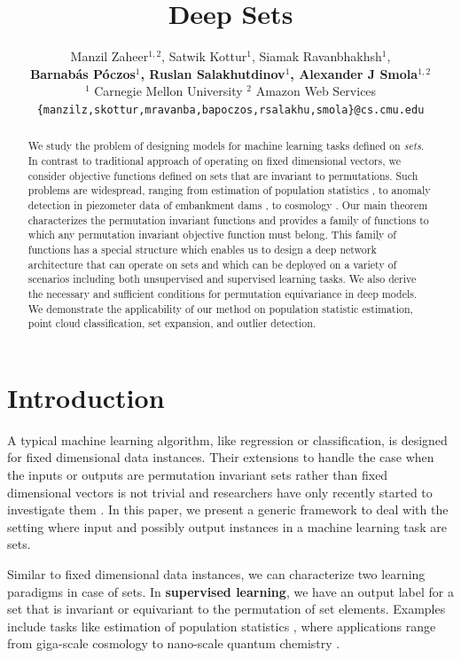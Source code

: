 \documentclass{article}
\title{Deep Sets}
\author{
Manzil Zaheer$^{1,2}$, 
Satwik Kottur$^1$, 
Siamak Ravanbhakhsh$^1$,\\
\textbf{Barnab\'as  P\'oczos$^1$,
Ruslan Salakhutdinov$^1$,
Alexander J Smola$^{1,2}$}\\
$^1$ Carnegie Mellon University \qquad $^2$ Amazon Web Services\\
\texttt{\{manzilz,skottur,mravanba,bapoczos,rsalakhu,smola\}@cs.cmu.edu}}
\begin{document}
\maketitle

\begin{abstract}
We study the problem of designing models for machine learning tasks defined on \emph{sets}.
In contrast to traditional approach of operating on fixed dimensional vectors, we consider objective functions defined on sets that are invariant to permutations.
Such problems are widespread, ranging from estimation of population statistics \cite{poczos13aistats}, to anomaly detection in piezometer data of embankment dams \cite{Jung15Exploration}, to cosmology \cite{Ntampaka16Dynamical,Ravanbakhsh16ICML1}.
Our main theorem characterizes the permutation invariant functions and provides a family of functions to which any permutation invariant objective function must belong. This family of functions has a special structure which enables us to design a deep network architecture that can operate on sets and which can be deployed on a variety of scenarios including both unsupervised and supervised learning tasks. We also derive the necessary and sufficient conditions for permutation equivariance in deep models. We demonstrate the applicability of our method on population statistic estimation, point cloud classification, set expansion, and outlier detection.
\end{abstract}

\vspace{-5mm}
\section{Introduction}
\label{sec:introduction}

A typical machine learning algorithm, like regression or classification, is designed for fixed dimensional data instances.
Their extensions to handle the case when the inputs or outputs are permutation invariant sets rather than fixed dimensional vectors is not trivial and researchers have only recently started to investigate them  \cite{oliva13ICML,szabo16JMLR,muandet13ICML,muandet12NIPS}.
In this paper, we present a generic framework to deal with the setting where input and possibly output instances in a machine learning task are sets.

Similar to fixed dimensional data instances, we can characterize two learning paradigms in case of sets.
In \textbf{supervised learning}, we have an output label for a set that is invariant or equivariant to the permutation of set elements. Examples include tasks like estimation of population statistics \cite{poczos13aistats}, where applications range from giga-scale cosmology \cite{Ntampaka16Dynamical,Ravanbakhsh16ICML1} to nano-scale quantum chemistry \cite{PhysRevLett.117.135502}.
\end{document}
